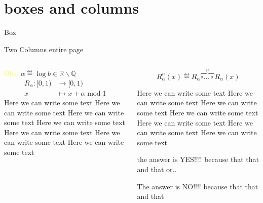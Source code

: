\section{boxes and columns}
 \frame{\sectionpage}
 
\begin{frame}{Box}
    \begin{center}
        \textcolor{yellow}{} 

    \bigskip    
    
    \fbox{\parbox{\textwidth}{A big box\\ \[ 
    \{R^n_{\alpha}(0) \; | \; n \in \mathbb{N}\} = \{n\alpha \; \mathrm{mod}\;1 \; | \; n \in \mathbb{N}\} \]
    é denso em \([0,1)\). }}
 \end{center}
\end{frame}
    
\begin{frame}{Two Columns entire page}
\small

\begin{columns}
\begin{column}{0.5\textwidth}
\tiny \pause \textcolor{yellow}{Obs:} \(\alpha \eqdef \log b \in \mathbb{R}\backslash\mathbb{Q}\)
\small \pause 
   \begin{align*}
    R_\alpha \colon [0,1) &\longrightarrow [0,1) \\
                      x   &\longmapsto x + \alpha \; \mathrm{mod}\;1           
\end{align*}
\pause 
\small 
Here we can write some text Here we can write some text Here we can write some text Here we can write some text Here we can write some text  Here we can write some text  Here we can write some text
\end{column}
\begin{column}{0.5\textwidth}  %
\pause 
\[R^n_\alpha(x) \eqdef R_\alpha \overbrace{\circ \ldots \circ }^{n} R_\alpha(x)\]

\pause 

Here we can write some text Here we can write some text Here we can write some text Here we can write some text Here we can write some text  Here we can write some text  Here we can write some text

\bigskip 

\footnotesize 
\textcolor{yellow}{} 
\bigskip

the answer is 
\pause 
\textcolor{green2}{YES!!!!} \textcolor{green2}{because that that and that} or..

\bigskip 

The answer is \textcolor{red2}{NO!!!!} \textcolor{red2}{because that that and that}

\end{column}
\end{columns}

\end{frame}
    
